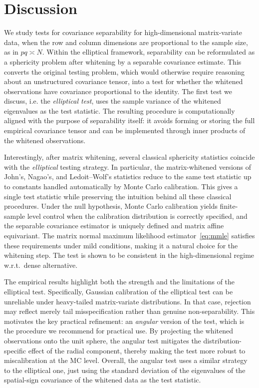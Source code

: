 \documentclass[12pt]{article}
\begin{document}
\section{Discussion}

We study tests for covariance separability for high-dimensional matrix-variate data, when the row and column dimensions are proportional to the sample size, as in $pq\asymp N$. Within the elliptical framework, separability can be reformulated as a sphericity problem after whitening by a separable covariance estimate. This converts the original testing problem, which would otherwise require reasoning about an unstructured covariance tensor, into a test for whether the whitened observations have covariance proportional to the identity. The first test we discuss, i.e. the \emph{elliptical test}, uses the sample variance of the whitened eigenvalues as the test statistic. The resulting procedure is computationally aligned with the purpose of separability itself: it avoids forming or storing the full empirical covariance tensor and can be implemented through inner products of the whitened observations.

\newpage
Interestingly, after matrix whitening, several classical sphericity statistics coincide with the \emph{elliptical} testing strategy. In particular, the matrix-whitened versions of John’s, Nagao’s, and Ledoit–Wolf’s statistics reduce to the same test statistic up to constants handled automatically by Monte Carlo calibration. This gives a single test statistic while preserving the intuition behind all these classical procedures. Under the null hypothesis, Monte Carlo calibration yields finite-sample level control when the calibration distribution is correctly specified, and the separable covariance estimator is uniquely defined and matrix affine equivariant. The matrix normal maximum likelihood estimator~\eqref{eq:mmle} satisfies these requirements under mild conditions, making it a natural choice for the whitening step. The test is shown to be consistent in the high-dimensional regime w.r.t.~dense alternative.

The empirical results highlight both the strength and the limitations of the elliptical test.
Specifically, Gaussian calibration of the elliptical test can be unreliable under heavy-tailed matrix-variate distributions. In that case, rejection may reflect merely tail misspecification rather than genuine non-separability.
This motivates the key practical refinement: an \emph{angular} version of the test, which is the procedure we recommend for practical use. By projecting the whitened observations onto the unit sphere, the angular test mitigates the distribution-specific effect of the radial component, thereby making the test more robust to miscalibration at the MC level. Overall, the angular test uses a similar strategy to the elliptical one, just using the standard deviation of the eigenvalues of the spatial-sign covariance of the whitened data as the test statistic.
\end{document}
